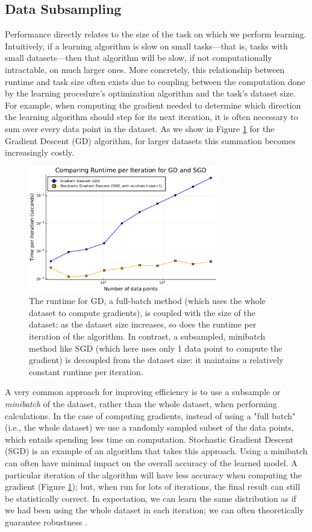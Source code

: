 \documentclass[sigplan,screen]{acmart}
\begin{document}
\subsection{Data Subsampling} \label{sec:subsampling}
Performance directly relates to the size of the task on which we perform learning. Intuitively, if a learning algorithm is slow on small tasks---that is, tasks with small datasets---then that algorithm will be slow, if not computationally intractable, on much larger ones. More concretely, this relationship between runtime and task size often exists due to coupling between the computation done by the learning procedure's optimization algorithm and the task's dataset size. For example, when computing the gradient needed to determine which direction the learning algorithm should step for its next iteration, it is often necessary to sum over every data point in the dataset. As we show in Figure \ref{fig:time} for the Gradient Descent (GD) algorithm, for larger datasets this summation becomes increasingly costly.

\begin{figure}[h]
	\includegraphics[width=8.25cm]{figs/timesgd.pdf}
	\caption{The runtime for GD, a full-batch method (which uses the whole dataset to compute gradients), is coupled with the size of the dataset: as the dataset size increases, so does the runtime per iteration of the algorithm. In contrast, a subsampled, minibatch method like SGD (which here uses only 1 data point to compute the gradient) is decoupled from the dataset size: it maintains a relatively constant runtime per iteration.}
	\label{fig:time}
\end{figure}

A very common approach for improving efficiency is to use a subsample or \emph{minibatch} of the dataset, rather than the whole dataset, when performing calculations. In the case of computing gradients, instead of using a "full batch" (i.e., the whole dataset) we use a randomly sampled subset of the data points, which entails spending less time on computation. Stochastic Gradient Descent (SGD) is an example of an algorithm that takes this approach. Using a minibatch can often have minimal impact on the overall accuracy of the learned model. A particular iteration of the algorithm will have less accuracy when computing the gradient (Figure \ref{fig:time}); but, when run for lots of iterations, the final result can still be statistically correct. In expectation, we can learn the same distribution as if we had been using the whole dataset in each iteration; we can often theoretically guarantee robustness \cite{Kiefer1952StochasticEO, Bottou2018sgd}.
\end{document}
